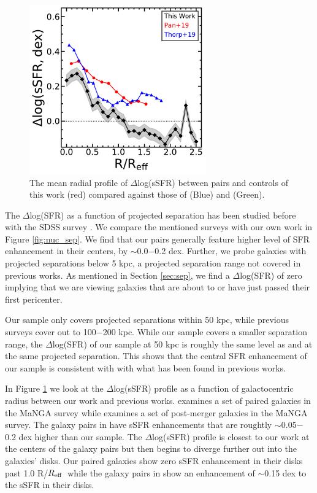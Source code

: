 \documentclass[iop,revtex4,twocolumn,apj,numberedappendix,appendixfloats]{emulateapj}
\newcommand{\reff}{$R_{\rm eff}$}
\begin{document}
\begin{figure}
\centering
\includegraphics[width=3in]{fig/prof_comp.pdf}
\caption[]{The mean radial profile of $\Delta$log(sSFR) between pairs and controls of this work (red) compared against those of \citet{Pan:2019} (Blue) and \citet{Thorp:2019} (Green).}
\label{fig:prof_comp}
\end{figure}

The $\Delta$log(SFR) as a function of projected separation has been studied before with the SDSS survey \citep{Ellison:2008, Patton:2013, Scudder:2012, Bustamante:2020}. We compare the mentioned surveys with our own work in Figure \ref{fig:nuc_sep}. We find that our pairs generally feature higher level of SFR enhancement in their centers, by $\sim$0.0$-$0.2 dex. Further, we probe galaxies with projected separations below 5 kpc, a projected separation range not covered in previous works. As mentioned in Section \ref{sec:sep}, we find a $\Delta$log(SFR) of zero implying that we are viewing galaxies that are about to or have just passed their first pericenter. 

Our sample only covers projected separations within 50 kpc, while previous surveys cover out to 100$-$200 kpc. While our sample covers a smaller separation range, the $\Delta$log(SFR) of our sample at 50 kpc is roughly the same level as \citet{Scudder:2012} and \citet{Patton:2013} at the same projected separation. This shows that the central SFR enhancement of our sample is consistent with with what has been found in previous works. 

In Figure \ref{fig:prof_comp} we look at the $\Delta$log(sSFR) profile as a function of galactocentric radius between our work and previous works. \citet{Pan:2019} examines a set of paired galaxies in the MaNGA survey while \citet{Thorp:2019} examines a set of post-merger galaxies in the MaNGA survey. The galaxy pairs in \citet{Pan:2019} have sSFR enhancements that are roughtly $\sim$0.05$-$0.2 dex higher than our sample. The $\Delta$log(sSFR) profile is closest to our work at the centers of the galaxy pairs but then begins to diverge further out into the galaxies' disks. Our paired galaxies show zero sSFR enhancement in their disks past 1.0 R/\reff\ while the galaxy pairs in \citet{Pan:2019} show an enhancement of $\sim$0.15 dex to the sSFR in their disks. 
\end{document}
